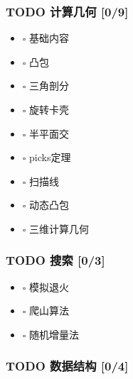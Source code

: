 \documentclass[11pt]{article}
\begin{document}
\subsubsection{{\bfseries\sffamily TODO} 计算几何 [0/9]}
\label{sec-1-1-5}

\begin{itemize}
\item $\square$ 基础内容
\item $\square$ 凸包
\item $\square$ 三角剖分
\item $\square$ 旋转卡壳
\item $\square$ 半平面交
\item $\square$ picks定理
\item $\square$ 扫描线
\item $\square$ 动态凸包
\item $\square$ 三维计算几何
\end{itemize}

\subsubsection{{\bfseries\sffamily TODO} 搜索 [0/3]}
\label{sec-1-1-6}

\begin{itemize}
\item $\square$ 模拟退火
\item $\square$ 爬山算法
\item $\square$ 随机增量法
\end{itemize}

\subsubsection{{\bfseries\sffamily TODO} 数据结构 [0/4]}
\label{sec-1-1-7}
\end{document}
